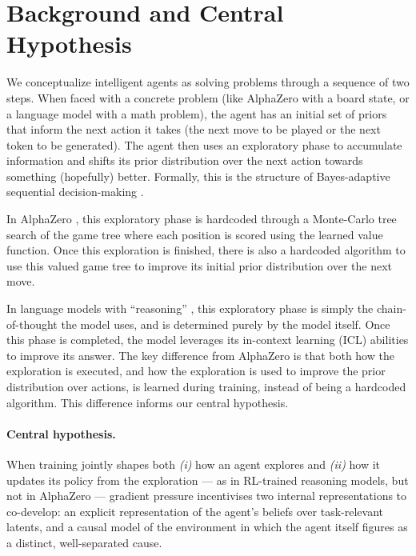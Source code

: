 \documentclass[11pt]{article}
\begin{document}
\section*{Background and Central Hypothesis}

We conceptualize intelligent agents as solving problems through a sequence of two steps. When faced with a concrete problem (like AlphaZero with a board state, or a language model with a math problem), the agent has an initial set of priors that inform the next action it takes (the next move to be played or the next token to be generated). The agent then uses an exploratory phase to accumulate information and shifts its prior distribution over the next action towards something (hopefully) better. Formally, this is the structure of Bayes-adaptive sequential decision-making \citep{duff2002,ghavamzadeh2015}.

In AlphaZero \citep{silver2018alphazero}, this exploratory phase is hardcoded through a Monte-Carlo tree search of the game tree where each position is scored using the learned value function. Once this exploration is finished, there is also a hardcoded algorithm to use this valued game tree to improve its initial prior distribution over the next move.

In language models with ``reasoning'' \citep{deepseek2025r1}, this exploratory phase is simply the chain-of-thought the model uses, and is determined purely by the model itself. Once this phase is completed, the model leverages its in-context learning (ICL) abilities \citep{brown2020gpt3,xie2022icl} to improve its answer. The key difference from AlphaZero is that both how the exploration is executed, and how the exploration is used to improve the prior distribution over actions, is learned during training, instead of being a hardcoded algorithm. This difference informs our central hypothesis.

\paragraph{Central hypothesis.} When training jointly shapes both \emph{(i)} how an agent explores and \emph{(ii)} how it updates its policy from the exploration --- as in RL-trained reasoning models, but not in AlphaZero --- gradient pressure incentivises two internal representations to co-develop: an explicit representation of the agent's beliefs over task-relevant latents, and a causal model of the environment in which the agent itself figures as a distinct, well-separated cause. 
\end{document}

